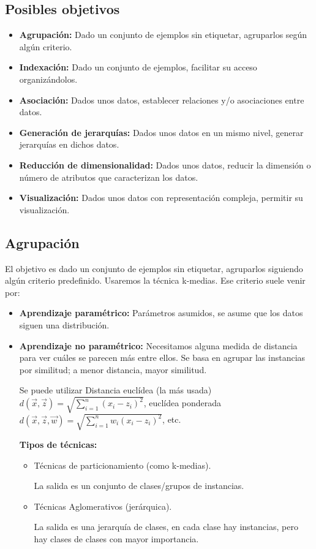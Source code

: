 \documentclass[12pt, twoside, openright]{report} %
\begin{document}
\subsection{Posibles objetivos}
\begin{itemize}
	\item \textbf{Agrupación:} Dado un conjunto de ejemplos sin etiquetar, agruparlos según algún criterio.
	\item \textbf{Indexación:} Dado un conjunto de ejemplos, facilitar su acceso organizándolos.
	\item \textbf{Asociación:} Dados unos datos, establecer relaciones y/o asociaciones entre datos.
	\item \textbf{Generación de jerarquías:} Dados unos datos en un mismo nivel, generar jerarquías en dichos datos.
	\item \textbf{Reducción de dimensionalidad:} Dados unos datos, reducir la dimensión o número de atributos que caracterizan los datos.
	\item \textbf{Visualización:} Dados unos datos con representación compleja, permitir su visualización.
\end{itemize}

\subsection{Agrupación}
El objetivo es dado un conjunto de ejemplos sin etiquetar, agruparlos siguiendo algún criterio predefinido. Usaremos la técnica k-medias.
Ese criterio suele venir por:
\begin{itemize}
	\item \textbf{Aprendizaje paramétrico:} Parámetros asumidos, se asume que los datos siguen una distribución.
	\item \textbf{Aprendizaje no paramétrico:} Necesitamos alguna medida de distancia para ver cuáles se parecen más entre ellos. Se basa en agrupar las instancias por similitud; a menor distancia, mayor similitud.

	      Se puede utilizar Distancia euclídea (la más usada) $d\left( \vec{x},\vec{z}\right)   = \sqrt {\sum _{i=1}^{n}  \left( x_{i}-z_{i}\right)^2 }$, euclídea ponderada $d\left( \vec{x},\vec{z},\vec{w}\right)   = \sqrt {\sum _{i=1}^{n} w_i \left( x_{i}-z_{i}\right)^2 }$, etc.

	      \textbf{Tipos de técnicas:}
	      \begin{itemize}
		      \item Técnicas de particionamiento (como k-medias).

		            La salida es un conjunto de clases/grupos de instancias.
		      \item Técnicas Aglomerativos (jerárquica).

		            La salida es una jerarquía de clases, en cada clase hay instancias, pero hay clases de clases con mayor importancia.
	      \end{itemize}
\end{itemize}
\end{document}
